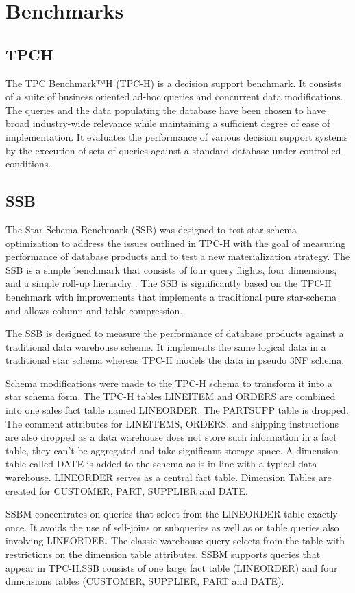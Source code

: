 \section{Benchmarks}
\label{sec:bench}

\subsection{TPCH}

The TPC Benchmark™H (TPC-H) is a decision support benchmark. It consists of a suite of business oriented ad-hoc queries and concurrent data modifications. The queries and the 
data populating the database have been chosen to have broad industry-wide relevance while maintaining a sufficient degree of ease of implementation. It  evaluates the performance of various decision support systems by the execution of sets of queries against a standard database under controlled conditions.



\subsection{SSB}

The Star Schema Benchmark (SSB) was designed to test star schema optimization to address the issues outlined in TPC-H with the goal of measuring performance of database  products  and  to  test  a  new  materialization  strategy. The  SSB  is  a  simple  benchmark  that  consists  of  four  query flights,  four  dimensions,  and  a  simple  roll-up  hierarchy . The SSB is significantly based on the TPC-H benchmark with improvements  that  implements  a  traditional  pure  star-schema and allows column and table compression.

The  SSB  is  designed  to  measure the performance  of  database products  against  a  traditional  data  warehouse  scheme.  It  implements  the  same  logical  data  in  a  traditional  star  schema whereas TPC-H models the data in pseudo 3NF schema.

Schema  modifications  were  made  to  the  TPC-H  schema to transform  it  into  a star  schema  form.  The TPC-H tables LINEITEM and ORDERS are combined into one sales fact table named LINEORDER. The PARTSUPP table  is  dropped.  The comment  attributes  for LINEITEMS, ORDERS,  and  shipping instructions  are  also  dropped  as  a  data  warehouse  does  not store such information in a fact table, they can’t be aggregated and take significant storage space. A  dimension  table  called DATE is  added  to  the  schema as  is  in  line  with  a  typical  data  warehouse. LINEORDER serves  as  a  central  fact  table.  Dimension Tables  are  created  for CUSTOMER, PART, SUPPLIER and DATE.

SSBM concentrates on queries that select from the LINEORDER table  exactly  once.  It  avoids   the use  of  self-joins  or  subqueries  as  well  as  or  table  queries also  involving LINEORDER.  The  classic  warehouse  query selects  from  the  table  with  restrictions  on  the  dimension table attributes. SSBM supports queries that appear in TPC-H.SSB consists of one large fact table (LINEORDER) and four dimensions tables (CUSTOMER, SUPPLIER, PART and DATE).
